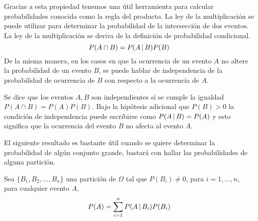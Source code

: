 Gracias a esta propiedad tenemos una útil herramienta para calcular probabilidades conocida como la regla del producto. La ley de la multiplicación se puede utilizar para determinar la probabilidad de la intersección de dos eventos. La ley de la multiplicación se deriva de la definición de probabilidad condicional.
$$P(A\cap B)=P(A\thinspace|\thinspace B)P(B)$$
De la misma manera, en los casos en que la
ocurrencia de un evento $A$ no altere la probabilidad de un evento $B$, se puede hablar de independencia de la probabilidad de ocurrencia de $B$ con respecto a la ocurrencia de $A$.
\begin{Def}
    Se dice que los eventos $A, B$ son independientes si se cumple la igualdad $P(A\cap B)=P(A)P(B)$. Bajo la hipótesis adicional que $P(B)>0$ la condición de independencia puede escribirse como $P(A\thinspace|\thinspace B)=P(A)$ y esto significa que la ocurrencia del evento $B$ no afecta al evento $A$.
\end{Def}
El siguiente resultado es bastante útil cuando se quiere determinar la probabilidad de algún conjunto grande, bastará con hallar las probabilidades de alguna partición.
\begin{Teo}
    Sea $\{B_1,B_2,\ldots,B_n\}$ una partición de $\Omega$ tal que $P(B_i)\not=0$, para  $i=1,\ldots,n$, para cualquier evento $A$, $$P(A)=\sum_{i=1}^n P(A\thinspace|\thinspace B_i)P(B_i)$$
\end{Teo}

